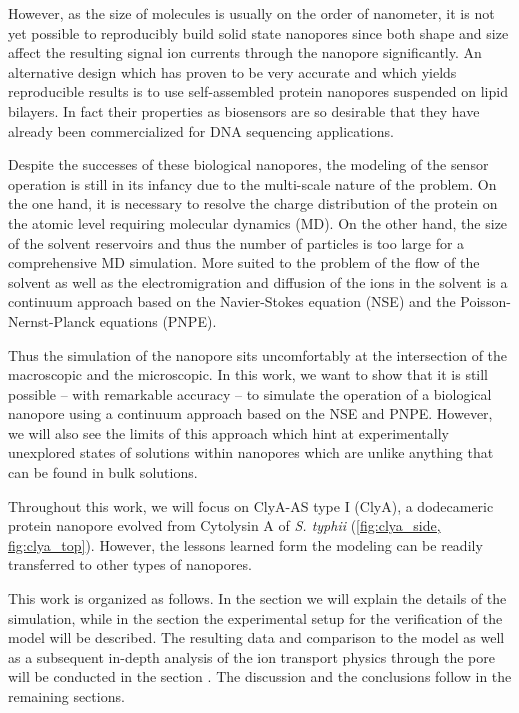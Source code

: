 \documentclass[journal=ancac3, manuscript=article, etalmode=truncate,maxauthors=0]{achemso}
\begin{document}
However, as the size of molecules is usually on the order of nanometer, it is not yet possible to reproducibly
build solid state nanopores\cite{} since both shape and size affect the resulting signal ion currents through
the nanopore significantly. An alternative design which has proven to be very accurate and which yields
reproducible results is to use self-assembled protein nanopores suspended on lipid bilayers.\cite{deam2016}
In fact their properties as biosensors are so desirable that they have already been commercialized for DNA
sequencing applications.\cite{???}

Despite the successes of these biological nanopores, the modeling of the sensor operation is still
in its infancy due to the multi-scale nature of the problem. On the one hand, it is necessary to
resolve the charge distribution of the protein on the atomic level requiring molecular dynamics
(MD).\cite{}  On the other hand, the size of the solvent reservoirs and thus the number of
particles is too large for a comprehensive MD simulation. More suited to the problem of the
flow of the solvent as well as the electromigration and diffusion of the ions in the solvent is a
continuum approach based on the Navier-Stokes equation (NSE) and the Poisson-Nernst-Planck equations
(PNPE).\cite{}

Thus the simulation of the nanopore sits uncomfortably at the intersection of the macroscopic and the
microscopic. In this work, we want to show that it is still possible -- with remarkable accuracy --
to simulate the operation of a biological nanopore using a continuum approach based on the NSE and
PNPE. However, we will also see the limits of this approach which hint at experimentally unexplored states of
solutions within nanopores which are unlike anything that can be found in bulk solutions.

Throughout this work, we will focus on ClyA-AS type I (ClyA), a dodecameric protein nanopore evolved from
Cytolysin A of \textit{S. typhii} (\cref{fig:clya_side, fig:clya_top}).\cite{soskine2013} 
However, the lessons learned form the modeling can be readily transferred to other types of nanopores.

This work is organized as follows. In the section \emph{} we will explain the
details of the simulation, while in the section \emph{} the experimental setup for
the verification of the model will be described. The resulting data and comparison to the model as well as a
subsequent in-depth analysis of the ion transport physics through the pore will be conducted in the section
\emph{}. The discussion and the conclusions follow in the remaining sections.
\end{document}
